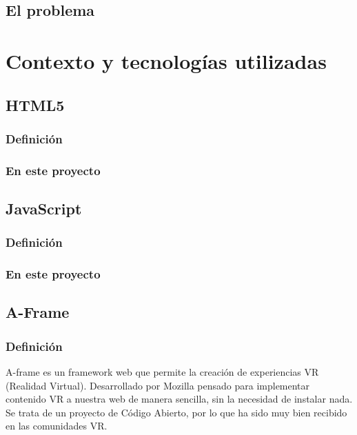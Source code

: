 \documentclass[a4paper, 12pt]{book}
\begin{document}
\section{El problema}
\label{sec:ElProblema}


\cleardoublepage
\chapter{Contexto y tecnolog\'ias utilizadas}
\label{sec:tecno} %



\section{HTML5}
\label{sec:html5}
\subsection{Definici\'on}
\subsection{En este proyecto}


\section{JavaScript}
\label{sec:js}
\subsection{Definici\'on}
\subsection{En este proyecto}


\section{A-Frame}
\label{sec:aframe}
\subsection{Definici\'on}
A-frame es un framework web que permite la creaci\'on de experiencias VR (Realidad Virtual). Desarrollado por Mozilla pensado para implementar contenido VR a nuestra web de manera sencilla, sin la necesidad de instalar nada. Se trata de un proyecto de C\'odigo Abierto, por lo que ha sido muy bien recibido en las comunidades VR.
\end{document}
